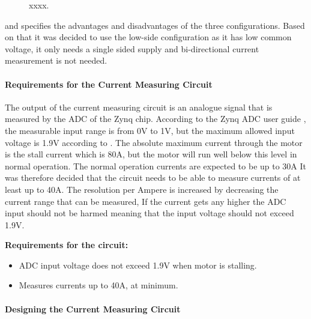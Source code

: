 \begin{figure}[h]
	\centering
	\caption{xxxx.}
	\label{fig:shunt_measure_high_in_low}
\end{figure}

\cite{shunt_placement} and \cite{Current_Sense_Circuit_Collection} specifies the advantages and disadvantages of the three configurations.
Based on that it was decided to use the low-side configuration as it has low common voltage, it only needs a single sided supply and bi-directional current measurement is not needed.


\paragraph{Requirements for the Current Measuring Circuit} %
\label{par:requirements_for_the_current_measuring_circuit}

The output of the current measuring circuit is an analogue signal that is measured by the ADC of the Zynq chip.
According to the Zynq ADC user guide \cite{zynq_adc}, the measurable input range is from 0V to 1V, but the maximum allowed input voltage is 1.9V according to \cite{adc_zynq_webanswer}.
The absolute maximum current through the motor is the stall current which is 80A, but the motor will run well below this level in normal operation.
The normal operation currents are expected to be up to 30A
It was therefore decided that the circuit  needs to be able to measure currents of at least up to 40A.
The resolution per Ampere is increased by decreasing the current range that can be measured,
If the current gets any higher the ADC input should not be harmed meaning that the input voltage should not exceed 1.9V.

\textbf{Requirements for the circuit:}
\begin{itemize}
	\item ADC input voltage does not exceed 1.9V when motor is stalling.
	\item Measures currents up to 40A, at minimum.
\end{itemize}


\paragraph{Designing the Current Measuring Circuit} %
\label{par:designing_the_current_measuring_circuit}

